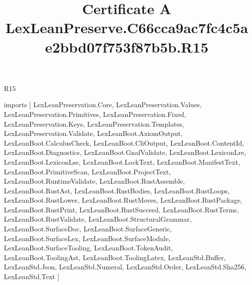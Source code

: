 \begin{lexlean}{R15}
\title{Certificate A LexLeanPreserve.C66cca9ac7fc4c5ae2bbd07f753f87b5b.R15}
\begin{coremodule}
imports [
  LexLeanPreservation.Core,
  LexLeanPreservation.Values,
  LexLeanPreservation.Primitives,
  LexLeanPreservation.Fixed,
  LexLeanPreservation.Keys,
  LexLeanPreservation.Templates,
  LexLeanPreservation.Validate,
  LexLeanBoot.AxiomOutput,
  LexLeanBoot.CalculusCheck,
  LexLeanBoot.CliOutput,
  LexLeanBoot.ContentId,
  LexLeanBoot.Diagnostics,
  LexLeanBoot.GnafValidate,
  LexLeanBoot.LexiconLre,
  LexLeanBoot.LexiconLse,
  LexLeanBoot.LockText,
  LexLeanBoot.ManifestText,
  LexLeanBoot.PrimitiveScan,
  LexLeanBoot.ProjectText,
  LexLeanBoot.RuntimeValidate,
  LexLeanBoot.RustAssemble,
  LexLeanBoot.RustAst,
  LexLeanBoot.RustBodies,
  LexLeanBoot.RustLoops,
  LexLeanBoot.RustLower,
  LexLeanBoot.RustMoves,
  LexLeanBoot.RustPackage,
  LexLeanBoot.RustPrint,
  LexLeanBoot.RustSucceed,
  LexLeanBoot.RustTerms,
  LexLeanBoot.RustValidate,
  LexLeanBoot.StructuralGrammar,
  LexLeanBoot.SurfaceDoc,
  LexLeanBoot.SurfaceGeneric,
  LexLeanBoot.SurfaceLex,
  LexLeanBoot.SurfaceModule,
  LexLeanBoot.SurfaceTooling,
  LexLeanBoot.TokenAudit,
  LexLeanBoot.ToolingAst,
  LexLeanBoot.ToolingLatex,
  LexLeanStd.Buffer,
  LexLeanStd.Json,
  LexLeanStd.Numeral,
  LexLeanStd.Order,
  LexLeanStd.Sha256,
  LexLeanStd.Text
]


\end{coremodule}
\end{lexlean}
